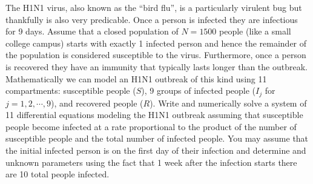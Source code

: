 \begin{problem}[H1N1 Problem]
    The H1N1 virus, also known as the ``bird flu'', is a particularly virulent bug but
    thankfully is also very predicable.  Once a person is infected they are infectious for
    9 days.  Assume that a closed population of $N = 1500$ people (like a small college
    campus) starts with exactly 1 infected person and hence the remainder of the
    population is considered susceptible to the virus.  Furthermore, once a person is
    recovered they have an immunity that typically lasts longer than the outbreak.
    Mathematically we can model an H1N1 outbreak of this kind using 11 compartments:
    susceptible people ($S$), 9 groups of infected people ($I_j$ for $j=1, 2, \cdots, 9$),
    and recovered people ($R$). Write and numerically solve a system of 11 differential equations modeling the
    H1N1 outbreak assuming that susceptible people become infected at a rate proportional
    to the product of the number of susceptible people and the total number of infected
    people. You may assume that the initial infected person is on the first day of their
    infection and determine and unknown parameters using the fact that 1 week after the
    infection starts there are 10 total people infected. 
\end{problem}


